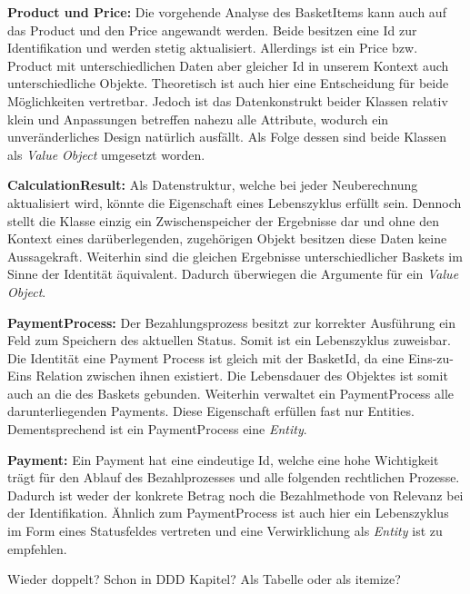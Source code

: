 {	\item \textbf{Product und Price: } {Die vorgehende Analyse des BasketItems kann auch auf das Product und den Price angewandt werden. Beide besitzen eine Id zur Identifikation und werden stetig aktualisiert. Allerdings ist ein Price bzw. Product mit unterschiedlichen Daten aber gleicher Id in unserem Kontext auch unterschiedliche Objekte. Theoretisch ist auch hier eine Entscheidung für beide Möglichkeiten vertretbar. Jedoch ist das Datenkonstrukt beider Klassen relativ klein und Anpassungen betreffen nahezu alle Attribute, wodurch ein unveränderliches Design natürlich ausfällt. Als Folge dessen sind beide Klassen als \emph{Value Object} umgesetzt worden. }
	\item \textbf{CalculationResult: } {Als Datenstruktur, welche bei jeder Neuberechnung aktualisiert wird, könnte die Eigenschaft eines Lebenszyklus erfüllt sein. Dennoch stellt die Klasse einzig ein Zwischenspeicher der Ergebnisse dar und ohne den Kontext eines darüberlegenden, zugehörigen Objekt besitzen diese Daten keine Aussagekraft. Weiterhin sind die gleichen Ergebnisse unterschiedlicher Baskets im Sinne der Identität äquivalent. Dadurch überwiegen die Argumente für ein \emph{Value Object}.}
	\item \textbf{PaymentProcess: } {Der Bezahlungsprozess besitzt zur korrekter Ausführung ein Feld zum Speichern des aktuellen Status. Somit ist ein Lebenszyklus zuweisbar. Die Identität eine Payment Process ist gleich mit der BasketId, da eine Eins-zu-Eins Relation zwischen ihnen existiert. Die Lebensdauer des Objektes ist somit auch an die des Baskets gebunden. Weiterhin verwaltet ein PaymentProcess alle darunterliegenden Payments. Diese Eigenschaft erfüllen fast nur Entities. Dementsprechend ist ein PaymentProcess eine \emph{Entity}.}
	\item \textbf{Payment: } {Ein Payment hat eine eindeutige Id, welche eine hohe Wichtigkeit trägt für den Ablauf des Bezahlprozesses und alle folgenden rechtlichen Prozesse. Dadurch ist weder der konkrete Betrag noch die Bezahlmethode von Relevanz bei der Identifikation. Ähnlich zum PaymentProcess ist auch hier ein Lebenszyklus im Form eines Statusfeldes vertreten und eine Verwirklichung als \emph{Entity} ist zu empfehlen.}
}

 Wieder doppelt? Schon in DDD Kapitel? Als Tabelle oder als itemize?





